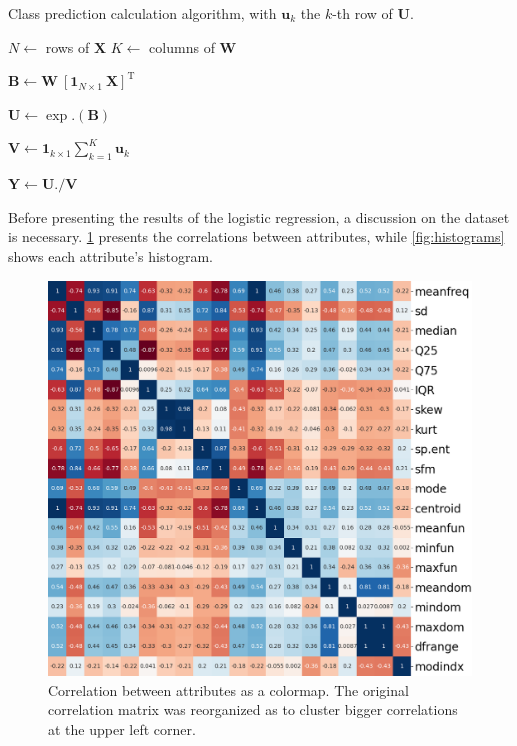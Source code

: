 \begin{algorithm}
    \caption{
        Class prediction calculation algorithm,
        with $\mathbf{u}_k$ the $k$-th row of $\mathbf{U}$.}


    $N \gets$ rows of $\mathbf{X}$\;
    $K \gets$ columns of $\mathbf{W}$\;
    
    $\mathbf{B} \gets \mathbf{W}\ [\mathbf{1}_{N\times 1}\ \mathbf{X}]^\text{T}$ 

    $\mathbf{U} \gets \exp.(\mathbf{B})$ 

    $\mathbf{V} \gets \mathbf{1}_{k\times 1} \displaystyle\sum_{k=1}^K \mathbf{u}_k$ 

    $\mathbf{Y} \gets \mathbf{U} ./ \mathbf{V}$ 
\end{algorithm}

Before presenting the results of the logistic regression, 
a discussion on the dataset is necessary.
\cref{fig:correlations} presents the correlations between attributes, 
while \cref{fig:histograms} shows each attribute's histogram.

\begin{figure}[htbp]
    \centering
    \caption{
        Correlation between attributes as a colormap. 
        The original correlation matrix was reorganized as to 
        cluster bigger correlations at the upper left corner.
    }
    \label{fig:correlations}
    \includegraphics[width=.7\textwidth]
    {../../python_code/plots/logistic_regression/correlations.png}
\end{figure}

